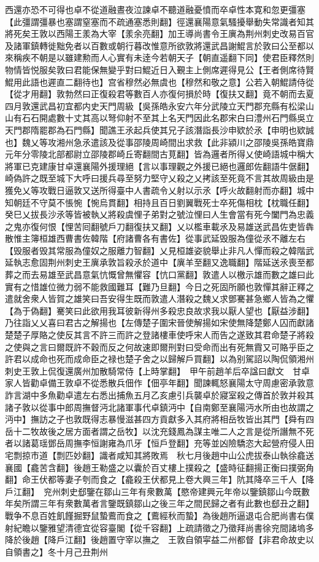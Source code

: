 西還亦恐不可得也卓不從道融晝夜泣諫卓不聽道融憂憤而卒卓性本寛和忽更彊塞【此彊謂彊暴也塞謂窒塞而不疏通塞悉則翻】徑還襄陽意氣騷擾舉動失常識者知其將死矣王敦以西陽王羕為大宰【羕余亮翻】加王導尚書令王廙為荆州刺史改易百官及諸軍鎮轉徙黜免者以百數或朝行暮改惟意所欲敦將還武昌謝鯤言於敦曰公至都以來稱疾不朝是以雖建勲而人心實有未逹今若朝天子【朝直遥翻下同】使君臣釋然則物情皆悦服矣敦曰君能保無變乎對曰鯤近日入覲主上側席遲得見公【王者側席待賢鯤用此語也遲直二翻待也】宫省穆然必無虞也【穆然和敬之意】公若入朝鯤請侍從【從才用翻】敦勃然曰正復殺君等數百人亦復何損於時【復扶又翻】竟不朝而去夏四月敦還武昌初宜都内史天門周級【吳孫皓永安六年分武陵立天門郡充縣有松梁山山有石石開處數十丈其高以弩仰射不至其上名天門因此名郡宋白曰澧州石門縣吳立天門郡隋罷郡為石門縣】聞譙王氶起兵使其兄子該潛詣長沙申欵於氶【申明也欵誠也】魏乂等攻湘州急氶遣該及從事邵陵周崎間出求救【此非潁川之邵陵吳孫皓寶鼎元年分零陵北部都尉立邵陵郡崎丘寄翻間古莧翻】皆為邏者所得乂使崎語城中稱大將軍已克建康甘卓還襄陽外援理絕【言以事理觀之外援已絕也邏郎佐翻語牛倨翻】崎偽許之既至城下大呼曰援兵尋至努力堅守乂殺之乂拷該至死竟不言其故周級由是獲免乂等攻戰日逼敦又送所得臺中人書疏令乂射以示氶【呼火故翻射而亦翻】城中知朝廷不守莫不悵惋【惋烏貫翻】相持且百日劉翼戰死士卒死傷相枕【枕職任翻】癸巳乂拔長沙氶等皆被執乂將殺虞悝子弟對之號泣悝曰人生會當有死今闔門為忠義之鬼亦復何恨【悝苦囘翻號戶刀翻復扶又翻】乂以檻車載氶及易雄送武昌佐吏皆犇散惟主簿桓雄西曹書佐韓階【府諸曹各有書佐】從事武延毁服為僮從氶不離左右【毁服者毁其常服為僮奴之服離力智翻】乂見桓雄姿貌舉止非凡人憚而殺之韓階武延執志愈固荆州刺史王廙承敦旨殺氶於道中【廙羊至翻又逸職翻】階延送氶喪至都葬之而去易雄至武昌意氣忼慨曾無懼容【忼口黨翻】敦遣人以檄示雄而數之雄曰此實有之惜雄位微力弱不能救國難耳【難乃旦翻】今日之死固所願也敦憚其辭正釋之遣就舍衆人皆賀之雄笑曰吾安得生既而敦遣人潛殺之魏乂求鄧騫甚急鄉人皆為之懼【為于偽翻】騫笑曰此欲用我耳彼新得州多殺忠良故求我以厭人望也【厭益涉翻】乃往詣乂乂喜曰君古之解揚也【左傳楚子圍宋晉使解揚如宋使無降楚鄭人囚而獻諸楚楚子厚賂之使反其言不許三而許之登諸樓車使呼宋人而告之遂致其君命楚子將殺之使與之言曰爾既許不穀而反之何故速即爾刑對曰受命而出有死無霣又可賂乎臣之許君以成命也死而成命臣之禄也楚子舍之以歸解戶買翻】以為别駕詔以陶侃領湘州刺史王敦上侃復還廣州加散騎常侍【上時掌翻】　甲午前趙羊后卒諡曰獻文　甘卓家人皆勸卓備王敦卓不從悉散兵佃作【佃亭年翻】聞諫輒怒襄陽太守周慮密承敦意詐言湖中多魚勸卓遣左右悉出捕魚五月乙亥慮引兵襲卓於寢室殺之傳首於敦并殺其諸子敦以從事中郎周撫督沔北諸軍事代卓鎮沔中【自南鄭至襄陽沔水所由也故謂之沔中】撫訪之子也敦既得志暴慢滋甚四方貢獻多入其府將相岳牧皆出其門【舜有四岳十二牧故後之居方面者謂之岳牧】以沈充錢鳳為謀主唯二人之言是從所譖無不死者以諸葛瑶鄧岳周撫李恒謝雍為爪牙【恒戶登翻】充等並凶險驕恣大起營府侵人田宅剽掠市道【剽匹妙翻】識者咸知其將敗焉　秋七月後趙中山公虎拔泰山執徐龕送襄國【龕苦含翻】後趙王勒盛之以囊於百丈樓上撲殺之【盛時征翻揚正衡曰撲弼角翻】命王伏都等妻子刳而食之【龕殺王伏都見上卷大興三年】阬其降卒三千人【降戶江翻】　兖州刺史郄鑒在鄒山三年有衆數萬【愍帝建興元年帝以鑒鎮鄒山今既數年矣所謂三年有衆數萬者言鑒既鎮鄒山之後三年之間民歸之者有此數也郄丑之翻】戰争不息百姓飢饉掘野鼠蟄鷰而食之【鷰經秋而蟄】為後趙所逼退屯合肥尚書右僕射紀瞻以鑒雅望清德宜從容臺閣【從千容翻】上疏請徵之乃徵拜尚書徐兖間諸塢多降於後趙【降戶江翻】後趙置守宰以撫之　王敦自領寜益二州都督【非君命故史以自領書之】冬十月己丑荆州